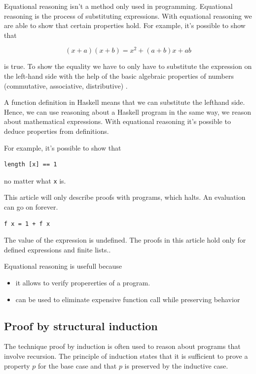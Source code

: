 \documentclass[twoside, a4paper]{article}
\begin{document}
Equational reasoning isn't a method only used in programming. Equational reasoning is the process of substituting expressions. With equational reasoning we are able to show that certain properties hold.
For example, it's possible to show that

\begin{equation}
  \label{eq:sum}
  (x+a)(x+b) = x^2 + (a+b)x+ab
\end{equation}

is true. To show the equality we have to only have to substitute the expression on the left-hand side with the help of the basic algebraic properties of numbers (commutative, associative, distributive) \cite{hutton}.

A function definition in Haskell means that we can substitute the lefthand side. Hence, we can use reasoning about a Haskell program in the same way, we reason about mathematical expressions. With equational reasoning it's possible to deduce properties from definitions.

For example, it's possible to show that 
\begin{verbatim}
length [x] == 1
\end{verbatim}
no matter what \verb|x| is.

This article will only describe proofs with programs, which halts. An evaluation can go on forever.
\begin{verbatim}
f x = 1 + f x
\end{verbatim}

The value of the expression is undefined. The proofs in this article hold only for defined expressions and finite lists..

Equational reasoning is usefull because
\begin{itemize}
\item it allows to verify propererties of a program.
\item can be used to eliminate expensive function call while preserving behavior
\end{itemize}

\subsection{Proof by structural induction}
\label{sec:induction}

The technique proof by induction is often used to reason about programs that involve recursion. The principle of induction states that it is sufficient to prove a property $p$ for the base case and that $p$ is preserved by the inductive case.
\end{document}
